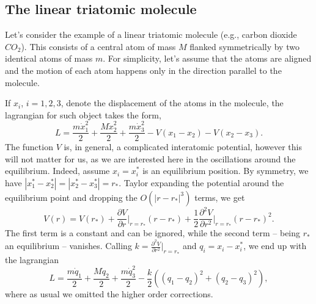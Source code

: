 \documentclass[english,fontsize=11pt,paper=b5]{scrbook}
\numberwithin{equation}{chapter}
\theoremstyle{definition}
\begin{document}
    \subsection{The linear triatomic molecule}\label{sec:triatomic}

    Let's consider the example of a linear triatomic molecule (e.g., carbon dioxide $CO_2$).
    This consists of a central atom of mass $M$ flanked symmetrically by two identical atoms of mass $m$.
    For simplicity, let's assume that the atoms are aligned and the motion of each atom happens only in the direction parallel to the molecule.

    If $x_i$, $i=1,2,3$, denote the displacement of the atoms in the molecule, the lagrangian for such object takes the form,
    \begin{equation}
      L = \frac{m\dot x_1^2}2 + \frac{M\dot x_2^2}2 + \frac{m\dot x_3^2}2
      - V(x_1 - x_2) - V(x_2 - x_3).
    \end{equation}
    The function $V$ is, in general, a complicated interatomic potential, however this will not matter for us, as we are interested here in the oscillations around the equilibrium.
    Indeed, assume $x_i = x_i^*$ is an equilibrium position. By symmetry, we have $|x_1^*-x_2^*| = |x_2^* - x_3^*| = r_*$.
    Taylor expanding the potential around the equilibrium point and dropping the $O\left(|r-r_*|^3\right)$ terms, we get
    \begin{equation}
      V(r) = V(r_*) + \frac{\partial V}{\partial r}\Big|_{r=r_*}(r-r_*) + \frac12 \frac{\partial^2 V}{\partial r^2}\Big|_{r=r_*}(r-r_*)^2.
    \end{equation}
    The first term is a constant and can be ignored, while the second term -- being $r_*$ an equilibrium -- vanishes. Calling $k = \frac{\partial^2 V}{\partial r^2}\big|_{r=r_*}$ and $q_i = x_i - x_i^*$, we end up with the lagrangian
    \begin{equation}
      L  = \frac{m \dot q_1}{2} + \frac{M \dot q_2}{2} + \frac{m\dot q_3^2}2 - \frac k2 \left((q_1 - q_2)^2 + (q_2 - q_3)^2\right),
    \end{equation}
    where as usual we omitted the higher order corrections.
\end{document}
